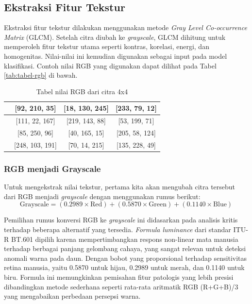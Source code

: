 \subsection{Ekstraksi Fitur Tekstur} \label{III.Ekstraksi Fitur Tekstur}
Ekstraksi fitur tekstur dilakukan menggunakan metode \textit{Gray Level Co-occurrence Matrix} (GLCM). Setelah citra diubah ke \textit{grayscale}, GLCM dihitung untuk memperoleh fitur tekstur utama seperti kontras, korelasi, energi, dan homogenitas. Nilai-nilai ini kemudian digunakan sebagai input pada model klasifikasi. Contoh nilai RGB yang digunakan dapat dilihat pada Tabel \ref{tab:tabel-rgb} di bawah.
\begin{table}[h!]
\centering
\begin{tabular}{|c|c|c|c|}
\hline
[155, 48, 201] & [92, 210, 35] & [18, 130, 245] & [233, 79, 12] \\
\hline
[64, 188, 251] & [111, 22, 167] & [219, 143, 88] & [53, 199, 71] \\
\hline
[176, 31, 238] & [85, 250, 96] & [40, 165, 15] & [205, 58, 124] \\
\hline
[25, 140, 67] & [248, 103, 191] & [70, 14, 215] & [135, 228, 49] \\
\hline
\end{tabular}
\caption{Tabel nilai RGB dari citra 4x4}
\end{table}

\subsubsection{RGB menjadi Grayscale} \label{III.RGB menjadi Grayscale}
Untuk mengekstrak nilai tekstur, pertama kita akan mengubah citra tersebut dari RGB menjadi \textit{grayscale} dengan menggunakan rumus berikut:
\[
\text{Grayscale} = (0.2989 \times \text{Red}) + (0.5870 \times \text{Green}) + (0.1140 \times \text{Blue})
\]

Pemilihan rumus konversi RGB ke \textit{grayscale} ini didasarkan pada analisis kritis terhadap beberapa alternatif yang tersedia. \textit{Formula luminance} dari standar ITU-R BT.601 dipilih karena mempertimbangkan respons non-linear mata manusia terhadap berbagai panjang gelombang cahaya, yang sangat relevan untuk deteksi anomali warna pada daun. Dengan bobot yang proporsional terhadap sensitivitas retina manusia, yaitu 0.5870 untuk hijau, 0.2989 untuk merah, dan 0.1140 untuk biru. Formula ini memungkinkan pemisahan fitur patologis yang lebih presisi dibandingkan metode sederhana seperti rata-rata aritmatik RGB (R+G+B)/3 yang mengabaikan perbedaan persepsi warna.


